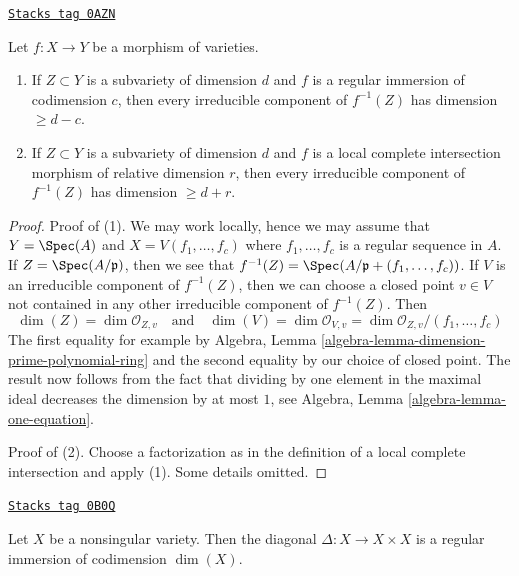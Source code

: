 \begin{lemma}
\label{intersection-lemma-pullback-by-regular-immersion}
\href{https://stacks.math.columbia.edu/tag/0AZN}{\texttt{Stacks tag 0AZN}}

Let $f : X \to Y$ be a morphism of varieties.
\begin{enumerate}
\item If $Z \subset Y$ is a subvariety of dimension $d$ and $f$ is a regular
immersion of codimension $c$, then every irreducible component
of $f^{-1}(Z)$ has dimension $\geq d - c$.
\item If $Z \subset Y$ is a subvariety of dimension $d$ and
$f$ is a local complete intersection morphism of relative dimension $r$,
then every irreducible component of $f^{-1}(Z)$ has dimension $\geq d + r$.
\end{enumerate}
\end{lemma}

\begin{proof}
Proof of (1). We may work locally, hence we may assume that
$Y = \Spec(A)$ and $X = V(f_1, \ldots, f_c)$ where $f_1, \ldots, f_c$
is a regular sequence in $A$. If $Z = \Spec(A/\mathfrak p)$, then
we see that $f^{-1}(Z) = \Spec(A/\mathfrak p + (f_1, \ldots, f_c))$.
If $V$ is an irreducible component of $f^{-1}(Z)$, then we can
choose a closed point $v \in V$ not contained in any other irreducible
component of $f^{-1}(Z)$. Then
$$
\dim(Z) = \dim \mathcal{O}_{Z, v}
\quad\text{and}\quad
\dim(V) = \dim \mathcal{O}_{V, v} = \dim \mathcal{O}_{Z, v}/(f_1, \ldots, f_c)
$$
The first equality for example by
Algebra, Lemma \ref{algebra-lemma-dimension-prime-polynomial-ring}
and the second equality by our choice of closed point.
The result now follows from the fact that dividing by one element
in the maximal ideal decreases the dimension by at most $1$, see
Algebra, Lemma \ref{algebra-lemma-one-equation}.

\medskip\noindent
Proof of (2). Choose a factorization as in the definition of a
local complete intersection and apply (1). Some details omitted.
\end{proof}

\begin{lemma}
\label{intersection-lemma-diagonal-regular-immersion}
\href{https://stacks.math.columbia.edu/tag/0B0Q}{\texttt{Stacks tag 0B0Q}}

Let $X$ be a nonsingular variety. Then the diagonal
$\Delta : X \to X \times X$ is a regular immersion of codimension $\dim(X)$.
\end{lemma}

